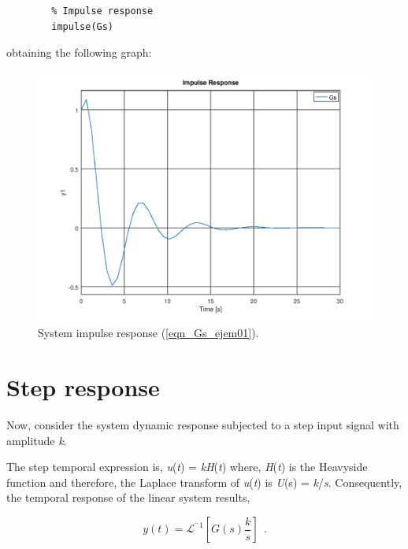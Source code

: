 \begin{enumerate}
\begin{verbatim}
		% Impulse response
		impulse(Gs)
		\end{verbatim}
		obtaining the following graph:
		
		\begin{figure}[H]
			\centering
			\includegraphics[scale=0.55]{./m/chapter_la/impulseGs_ltitool.png}
			\caption{System impulse response (\ref{eqn_Gs_ejem01}).}
			\label{chp_la_fig02_impulse}
		\end{figure}
		
	\end{enumerate}
	



\section{Step response}

Now, consider the system dynamic response subjected to a step input signal with amplitude \textit{k}.

The step temporal expression is, \textit{u}(\textit{t}) = \textit{kH}(\textit{t}) where, \textit{H}(\textit{t}) is the Heavyside function and therefore, the Laplace transform of \textit{u}(\textit{t}) is \textit{U}(s) = \textit{k}/\textit{s}.  Consequently, the temporal response of the linear system results,

\begin{equation} \label{Eq08_chp_trans}
y(t) =  \mathscr{L}^{^-1} \left[G(s) \frac{k}{s}  \right]   ~~\mbox{.}
\end{equation}

